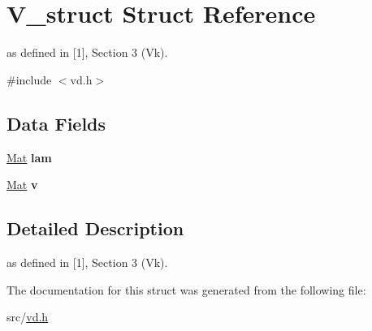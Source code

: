\hypertarget{structV__struct}{}\section{V\+\_\+struct Struct Reference}
\label{structV__struct}


as defined in \mbox{[}1\mbox{]}, Section 3 (Vk).  




{\ttfamily \#include $<$vd.\+h$>$}

\subsection*{Data Fields}
\begin{DoxyCompactItemize}
\item 
\mbox{\label{structV__struct_a56d1655953ba5bee519bd62d992abfff}} 
\mbox{\hyperlink{typedefs_8h_a9fa28c1f74e909474857584f5c7b0088}{Mat}} {\bfseries lam}
\item 
\mbox{\label{structV__struct_aa78c83185af94c1df09f59a689881cd9}} 
\mbox{\hyperlink{typedefs_8h_a9fa28c1f74e909474857584f5c7b0088}{Mat}} {\bfseries v}
\end{DoxyCompactItemize}


\subsection{Detailed Description}
as defined in \mbox{[}1\mbox{]}, Section 3 (Vk). 

The documentation for this struct was generated from the following file\+:\begin{DoxyCompactItemize}
\item 
src/\mbox{\hyperlink{vd_8h}{vd.\+h}}\end{DoxyCompactItemize}
